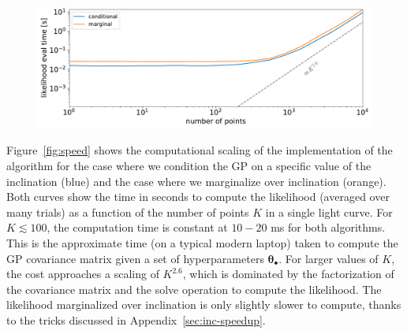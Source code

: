 \documentclass[modern]{aastex62}
\begin{document}
\begin{figure}[t!]
    \begin{centering}
        \includegraphics[width=\linewidth]{figures/speed.pdf}
    \end{centering}
\end{figure}

Figure~\ref{fig:speed} shows the computational scaling of the \Python
implementation of the algorithm for the case where we condition the GP
on a specific value of the inclination (blue) and the case where we marginalize
over inclination (orange). Both curves show the time in seconds to compute the
likelihood (averaged over many trials) as a function of the number of points $K$
in a single light curve. For $K \lesssim 100$, the computation time is constant
at $10-20$ ms for both algorithms. This is the approximate time (on a typical
modern laptop) taken to compute the GP covariance matrix given a set of
hyperparameters $\pmb{\theta}_\bullet$. For larger values of $K$, the
cost approaches a scaling of $K^{2.6}$, which is dominated by the factorization
of the covariance matrix and the solve operation to compute the likelihood.
The likelihood marginalized over inclination is only slightly slower to compute,
thanks to the tricks discussed in Appendix~\ref{sec:inc-speedup}.
\end{document}
